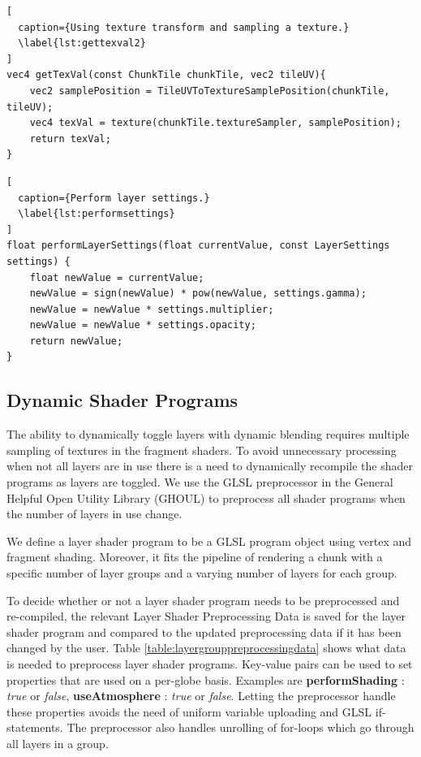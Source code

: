\begin{lstlisting}[
  caption={Using texture transform and sampling a texture.} 
  \label{lst:gettexval2}
]
vec4 getTexVal(const ChunkTile chunkTile, vec2 tileUV){
	vec2 samplePosition = TileUVToTextureSamplePosition(chunkTile, tileUV);
	vec4 texVal = texture(chunkTile.textureSampler, samplePosition);
	return texVal;
}
\end{lstlisting}


\begin{lstlisting}[
  caption={Perform layer settings.} 
  \label{lst:performsettings}
]
float performLayerSettings(float currentValue, const LayerSettings settings) {
	float newValue = currentValue;
	newValue = sign(newValue) * pow(newValue, settings.gamma);
	newValue = newValue * settings.multiplier;
	newValue = newValue * settings.opacity;
	return newValue;
}
\end{lstlisting}

\subsection{Dynamic Shader Programs}

The ability to dynamically toggle layers with dynamic blending requires multiple sampling of textures in the fragment shaders. To avoid unnecessary processing when not all layers are in use there is a need to dynamically recompile the shader programs as layers are toggled. We use the GLSL preprocessor in the General Helpful Open Utility Library (GHOUL)  to preprocess all shader programs when the number of layers in use change.

We define a layer shader program to be a GLSL program object using vertex and fragment shading. Moreover, it fits the pipeline of rendering a chunk with a specific number of layer groups and a varying number of layers for each group.

To decide whether or not a layer shader program needs to be preprocessed and re-compiled, the relevant Layer Shader Preprocessing Data is saved for the layer shader program and compared to the updated preprocessing data if it has been changed by the user. Table \ref{table:layergrouppreprocessingdata} shows what data is needed to preprocess layer shader programs. Key-value pairs can be used to set properties that are used on a per-globe basis. Examples are \textbf{performShading} : \emph{true} or \emph{false}, \textbf{useAtmosphere} : \emph{true} or \emph{false}. Letting the preprocessor handle these properties avoids the need of uniform variable uploading and GLSL if-statements. The preprocessor also handles unrolling of for-loops which go through all layers in a group.


